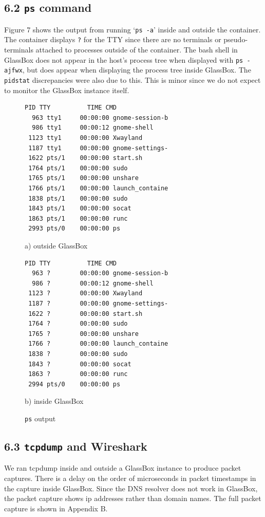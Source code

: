 \documentclass{proc}
\begin{document}
\subsection*{6.2 \texttt{ps} command}
Figure 7 shows the output from running `\texttt{ps -a}' inside and outside the container. The container displays \texttt{?} for the TTY since there are no terminals or pseudo-terminals attached to processes outside of the container. The bash shell in GlassBox does not appear in the host's process tree when displayed with \texttt{ps -ajfwx},  but does appear when displaying the process tree inside GlassBox. The \texttt{pidstat} discrepancies were also due to this. This is minor since we do not expect to monitor the GlassBox instance itself.
 \begin{figure}[h]
\begin{lstlisting}[linewidth=\linewidth]
  PID TTY          TIME CMD
  963 tty1     00:00:00 gnome-session-b
  986 tty1     00:00:12 gnome-shell
 1123 tty1     00:00:00 Xwayland
 1187 tty1     00:00:00 gnome-settings-
 1622 pts/1    00:00:00 start.sh
 1764 pts/1    00:00:00 sudo
 1765 pts/1    00:00:00 unshare
 1766 pts/1    00:00:00 launch_containe
 1838 pts/1    00:00:00 sudo
 1843 pts/1    00:00:00 socat
 1863 pts/1    00:00:00 runc
 2993 pts/0    00:00:00 ps
 \end{lstlisting}
\hspace{7.5em} a) outside GlassBox
 \begin{lstlisting}[linewidth=\linewidth]
  PID TTY          TIME CMD
  963 ?        00:00:00 gnome-session-b
  986 ?        00:00:12 gnome-shell
 1123 ?        00:00:00 Xwayland
 1187 ?        00:00:00 gnome-settings-
 1622 ?        00:00:00 start.sh
 1764 ?        00:00:00 sudo
 1765 ?        00:00:00 unshare
 1766 ?        00:00:00 launch_containe
 1838 ?        00:00:00 sudo
 1843 ?        00:00:00 socat
 1863 ?        00:00:00 runc
 2994 pts/0    00:00:00 ps
\end{lstlisting}
\hspace{7.5em} b) inside GlassBox
 \caption{\texttt{ps} output}
\end{figure}

\subsection*{6.3 \texttt{tcpdump} and Wireshark}
We ran tcpdump inside and outside a GlassBox instance to produce packet captures. There is a delay on the order of microseconds in packet timestamps in the capture inside GlassBox. Since the DNS resolver does not work in GlassBox, the packet capture shows ip addresses rather than domain names. The full packet capture is shown in Appendix B.
\end{document}
